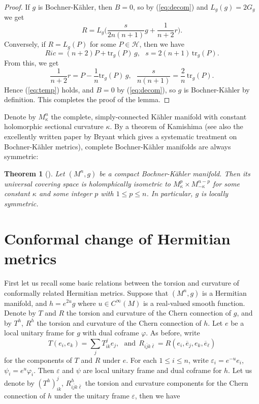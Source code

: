 \documentclass{amsart}
\newtheorem{theorem}{Theorem}%
\numberwithin{equation}{section}
\begin{document}
 \begin{proof}
If $g$ is Bochner-K\"ahler, then $B=0$, so by (\ref{eq:decom}) and $L_g(g)=2G_g$ we get
\begin{equation} \label{eq:temp}
 R = L_g\big(\frac{s}{2n(n+1)}g + \frac{1}{n+2}r\big).
 \end{equation}
Conversely, if $R=L_g(P)$ for some $P\in {\mathcal H}$, then we have
$$ Ric = (n+2)P + \mbox{tr}_g(P)\,g, \ \ \ s =2(n+1) \,\mbox{tr}_g(P).$$
From this, we get
$$ \frac{1}{n+2}r= P - \frac{1}{n}\mbox{tr}_g(P)\,g , \ \ \ \frac{s}{n(n+1)} = \frac{2}{n} \,\mbox{tr}_g(P).  $$
Hence (\ref{eq:temp}) holds, and $B=0$ by (\ref{eq:decom}), so $g$ is Bochner-K\"ahler by definition. This completes the proof of the lemma.
 \end{proof}


Denote by $M^n_{\kappa}$  the complete, simply-connected K\"ahler manifold with constant holomorphic sectional curvature $\kappa$. By a theorem of Kamishima \cite{Kamishima1994} (see also the excellently written paper by Bryant \cite{Bryant} which gives a systematic treatment on Bochner-K\"ahler metrics), complete Bochner-K\"ahler manifolds are always symmetric:
\begin{theorem}[\cite{Kamishima1994, Bryant}] \label{thm4}
Let $(M^n,g)$ be a compact Bochner-K\"ahler manifold. Then its universal covering space is holomphically isometric to $M^p_{\kappa}\times M^{n-p}_{-\kappa}$ for some constant $\kappa$ and some  integer $p$ with $1\leq p\leq n$. In particular, $g$ is locally symmetric.
\end{theorem}



\vspace{0.3cm}

\section{Conformal change of Hermitian metrics}

First let us recall some basic relations between the torsion and curvature of conformally related Hermitian metrics. Suppose that $(M^n,g)$ is a Hermitian manifold, and $h =e^{2u}g$ where $u \in C^{\infty}(M)$ is a real-valued smooth function. Denote by $T$ and $R$ the torsion and curvature of the Chern connection of $g$, and by $T^h$, $R^h$ the torsion and curvature of the Chern connection of $h$. Let $e$ be a local unitary frame for $g$ with dual coframe $\varphi$. As before, write
$$T(e_i, e_k) = \sum_j T^j_{ik}e_j, \ \ \ \mbox{and} \ \  R_{i\bar{j}k\bar{\ell}}=R(e_i,\overline{e}_j, e_k, \overline{e}_{\ell}) $$
for the components of $T$ and $R$ under $e$. For each $1\leq i\leq n$,   write $\varepsilon_i=e^{-u}e_i$, $\psi_i=e^u\varphi_i$. Then $\varepsilon$ and $\psi$ are local unitary frame and dual coframe for $h$. Let us denote by $(T^h)^j_{ik}$, $R^h_{i\bar{j}k\bar{\ell}}$ the torsion and curvature components for the Chern connection of $h$ under the unitary frame $\varepsilon$, then we have
\end{document}
